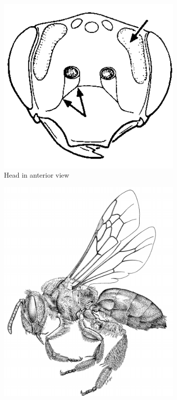 \documentclass[letterpaper, 11pt]{article}
\begin{document}
\begin{figure}[ht!]
    \centering
    \begin{subfigure}[ht!]{0.24\textwidth}
        \includegraphics[width=\textwidth]{AndrenidFace}
        \caption{Head in anterior view \citep[][pg. 313]{goulet1993hymenoptera}}
        \label{fig:andrenid1}
    \end{subfigure}
    \qquad
    \begin{subfigure}[ht!]{0.37\textwidth}
        \includegraphics[width=\textwidth]{AndrenidHabitus}

\end{subfigure}
\end{figure}
\end{document}
